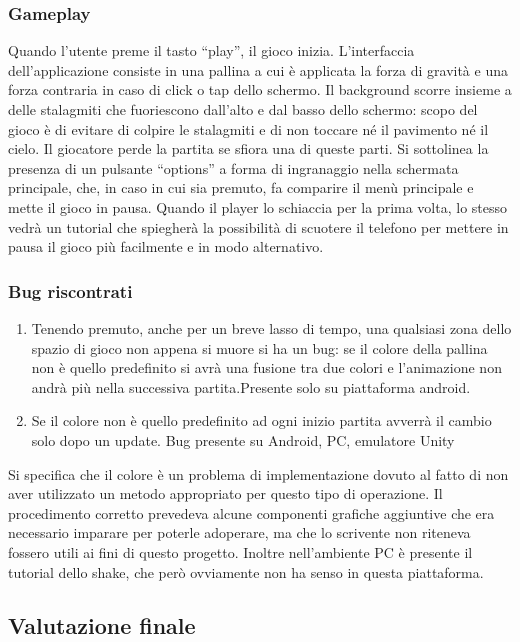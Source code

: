 \subsubsection{Gameplay}
Quando l’utente preme il tasto “play”, il gioco inizia. L’interfaccia dell’applicazione consiste in una pallina a cui è applicata la forza di gravità e una forza contraria in caso di click o tap dello schermo. Il background scorre insieme a delle stalagmiti che fuoriescono dall’alto e dal basso dello schermo: scopo del gioco è di evitare di colpire le stalagmiti e di non toccare né il pavimento né il cielo. Il giocatore perde la partita se sfiora una di queste parti.
Si sottolinea la presenza di un pulsante “options” a forma di ingranaggio nella schermata principale, che, in caso in cui sia premuto, fa comparire il menù principale e mette il gioco in pausa. Quando il player lo schiaccia per la prima volta, lo stesso vedrà un tutorial che spiegherà la possibilità di scuotere il telefono per mettere in pausa il gioco più facilmente e in modo alternativo.

\subsubsection{Bug riscontrati}
\begin{enumerate}
\item Tenendo premuto, anche per un breve lasso di tempo, una qualsiasi zona dello spazio di gioco non appena si muore si ha un bug: se il colore della pallina non è quello predefinito si avrà una fusione tra due colori e l’animazione non andrà più nella successiva partita.Presente solo su piattaforma android.
\item Se il colore non è quello predefinito ad ogni inizio partita avverrà il cambio solo dopo un update. Bug presente su Android, PC, emulatore Unity
\end{enumerate}

Si specifica che il colore è un problema di implementazione dovuto al fatto di non aver utilizzato un metodo appropriato per questo tipo di operazione. Il procedimento corretto prevedeva alcune componenti grafiche aggiuntive che era necessario imparare per poterle adoperare, ma che lo scrivente non riteneva fossero utili ai fini di questo progetto. Inoltre nell’ambiente PC è presente il tutorial dello shake, che però ovviamente non ha senso in questa piattaforma.



\subsection{Valutazione finale}

